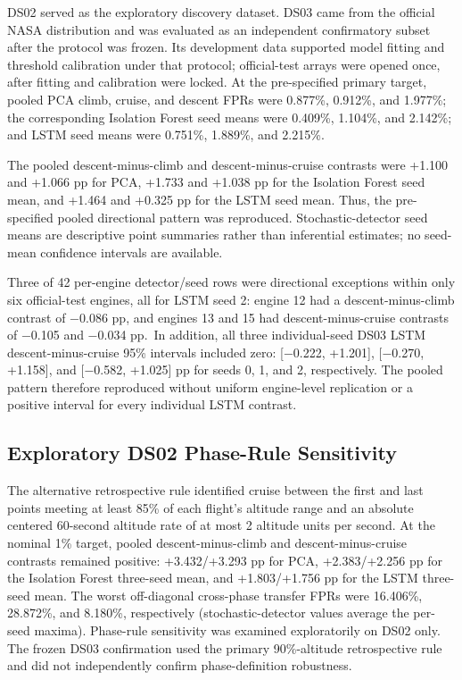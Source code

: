 \documentclass[preprint,12pt]{elsarticle}
\begin{document}
DS02 served as the exploratory discovery dataset. DS03 came from the official NASA distribution and was evaluated as an independent confirmatory subset after the protocol was frozen. Its development data supported model fitting and threshold calibration under that protocol; official-test arrays were opened once, after fitting and calibration were locked. At the pre-specified primary target, pooled PCA climb, cruise, and descent FPRs were 0.877\%, 0.912\%, and 1.977\%; the corresponding Isolation Forest seed means were 0.409\%, 1.104\%, and 2.142\%; and LSTM seed means were 0.751\%, 1.889\%, and 2.215\%.

The pooled descent-minus-climb and descent-minus-cruise contrasts were +1.100 and +1.066 pp for PCA, +1.733 and +1.038 pp for the Isolation Forest seed mean, and +1.464 and +0.325 pp for the LSTM seed mean. Thus, the pre-specified pooled directional pattern was reproduced. Stochastic-detector seed means are descriptive point summaries rather than inferential estimates; no seed-mean confidence intervals are available.

Three of 42 per-engine detector/seed rows were directional exceptions within only six official-test engines, all for LSTM seed 2: engine 12 had a descent-minus-climb contrast of −0.086 pp, and engines 13 and 15 had descent-minus-cruise contrasts of −0.105 and −0.034 pp.~In addition, all three individual-seed DS03 LSTM descent-minus-cruise 95\% intervals included zero: {[}−0.222, +1.201{]}, {[}−0.270, +1.158{]}, and {[}−0.582, +1.025{]} pp for seeds 0, 1, and 2, respectively. The pooled pattern therefore reproduced without uniform engine-level replication or a positive interval for every individual LSTM contrast.

\subsection{Exploratory DS02 Phase-Rule Sensitivity}\label{exploratory-ds02-phase-rule-sensitivity}

The alternative retrospective rule identified cruise between the first and last points meeting at least 85\% of each flight's altitude range and an absolute centered 60-second altitude rate of at most 2 altitude units per second. At the nominal 1\% target, pooled descent-minus-climb and descent-minus-cruise contrasts remained positive: +3.432/+3.293 pp for PCA, +2.383/+2.256 pp for the Isolation Forest three-seed mean, and +1.803/+1.756 pp for the LSTM three-seed mean. The worst off-diagonal cross-phase transfer FPRs were 16.406\%, 28.872\%, and 8.180\%, respectively (stochastic-detector values average the per-seed maxima). Phase-rule sensitivity was examined exploratorily on DS02 only. The frozen DS03 confirmation used the primary 90\%-altitude retrospective rule and did not independently confirm phase-definition robustness.
\end{document}
